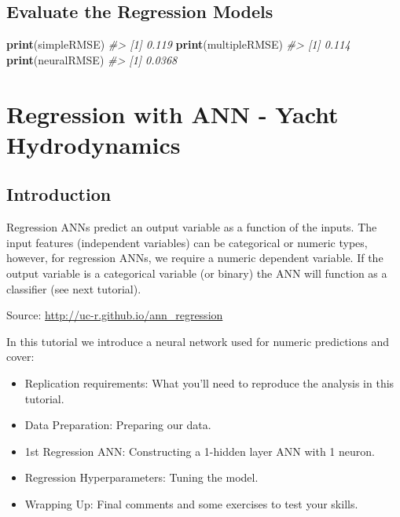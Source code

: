 \documentclass[]{book}
\newenvironment{Shaded}{\begin{snugshade}}{\end{snugshade}}
\newcommand{\CommentTok}[1]{\textcolor[rgb]{0.56,0.35,0.01}{\textit{#1}}}
\newcommand{\KeywordTok}[1]{\textcolor[rgb]{0.13,0.29,0.53}{\textbf{#1}}}
\newcommand{\NormalTok}[1]{#1}
\providecommand{\tightlist}{%
  \setlength{\itemsep}{0pt}\setlength{\parskip}{0pt}}
\begin{document}
\hypertarget{evaluate-the-regression-models}{%
\section{Evaluate the Regression Models}\label{evaluate-the-regression-models}}

\begin{Shaded}
\begin{Highlighting}[]
\KeywordTok{print}\NormalTok{(simpleRMSE)}
\CommentTok{#> [1] 0.119}
\KeywordTok{print}\NormalTok{(multipleRMSE)}
\CommentTok{#> [1] 0.114}
\KeywordTok{print}\NormalTok{(neuralRMSE)}
\CommentTok{#> [1] 0.0368}
\end{Highlighting}
\end{Shaded}

\hypertarget{regression-with-ann---yacht-hydrodynamics}{%
\chapter{Regression with ANN - Yacht Hydrodynamics}\label{regression-with-ann---yacht-hydrodynamics}}

\hypertarget{introduction-2}{%
\section{Introduction}\label{introduction-2}}

Regression ANNs predict an output variable as a function of the inputs. The input features (independent variables) can be categorical or numeric types, however, for regression ANNs, we require a numeric dependent variable. If the output variable is a categorical variable (or binary) the ANN will function as a classifier (see next tutorial).

Source: \url{http://uc-r.github.io/ann_regression}

In this tutorial we introduce a neural network used for numeric predictions and cover:

\begin{itemize}
\tightlist
\item
  Replication requirements: What you'll need to reproduce the analysis in this tutorial.
\item
  Data Preparation: Preparing our data.
\item
  1st Regression ANN: Constructing a 1-hidden layer ANN with 1 neuron.
\item
  Regression Hyperparameters: Tuning the model.
\item
  Wrapping Up: Final comments and some exercises to test your skills.
\end{itemize}
\end{document}
